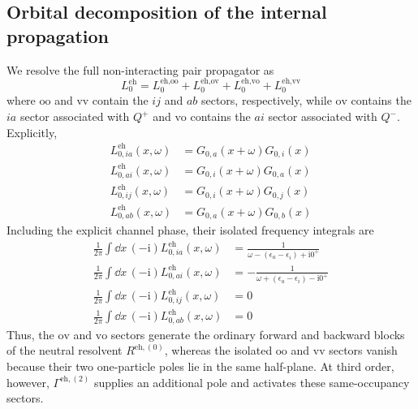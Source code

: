 \documentclass[aip,jcp,reprint,noshowkeys,superscriptaddress]{revtex4-1}
\newcommand{\eps}{\epsilon}
\newcommand{\ii}{\mathrm{i}}
\newcommand{\eh}{\text{eh}}
\begin{document}
\subsection{Orbital decomposition of the internal propagation}

We resolve the full non-interacting pair propagator as
\begin{equation}
    L_0^\eh
    =
    L_0^{\eh,\text{oo}}
    +
    L_0^{\eh,\text{ov}}
    +
    L_0^{\eh,\text{vo}}
    +
    L_0^{\eh,\text{vv}}
    \label{eq:L0_sector_decomposition}
\end{equation}
where $\text{oo}$ and $\text{vv}$ contain the $ij$ and $ab$ sectors, respectively,
while $\text{ov}$ contains the $ia$ sector associated with $Q^+$ and $\text{vo}$ contains
the $ai$ sector associated with $Q^-$.  Explicitly,
\begin{align}
    L_{0,ia}^{\eh}(x,\omega)
    &=
    G_{0,a}(x+\omega)G_{0,i}(x)
    \\
    L_{0,ai}^{\eh}(x,\omega)
    &=
    G_{0,i}(x+\omega)G_{0,a}(x)
    \\
    L_{0,ij}^{\eh}(x,\omega)
    &=
    G_{0,i}(x+\omega)G_{0,j}(x)
    \\
    L_{0,ab}^{\eh}(x,\omega)
    &=
    G_{0,a}(x+\omega)G_{0,b}(x)
    \label{eq:L0_eh_sectors}
\end{align}
Including the explicit channel phase, their isolated frequency integrals are
\begin{align}
    \frac{1}{2\pi}\int\dd{x}\,
    (-\ii) L_{0,ia}^{\eh}(x,\omega)
    &=
    \frac{1}{\omega-(\eps_a-\eps_i)+\ii0^+}
    \label{eq:eh_ov_integral}
    \\
    \frac{1}{2\pi}\int\dd{x}\,
    (-\ii) L_{0,ai}^{\eh}(x,\omega)
    &=
    -\frac{1}{\omega+(\eps_a-\eps_i)-\ii0^+}
    \label{eq:eh_vo_integral}
    \\
    \frac{1}{2\pi}\int\dd{x}\,
    (-\ii) L_{0,ij}^{\eh}(x,\omega)
    &=0
    \\
    \frac{1}{2\pi}\int\dd{x}\,
    (-\ii) L_{0,ab}^{\eh}(x,\omega)
    &=0
    \label{eq:same_occupancy_bubbles_zero}
\end{align}
Thus, the $\text{ov}$ and $\text{vo}$ sectors generate the ordinary forward and
backward blocks of the neutral resolvent $R^{\eh,(0)}$, whereas the isolated
$\text{oo}$ and $\text{vv}$ sectors vanish because their two one-particle poles lie in
the same half-plane.  At third order, however, $\Gamma^{\eh,(2)}$ supplies an
additional pole and activates these same-occupancy sectors.
\end{document}
